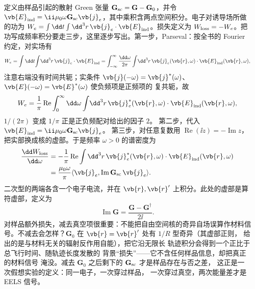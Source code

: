 定义由样品引起的散射 Green 张量 \(\mathbf G_{\rm sc}=\mathbf G-\mathbf G_0\)，并令 \(\vb{E}_{\rm ind}=\ii\mu_0\omega\mathbf G_{\rm sc}\vb{j}_e\)，其中乘积含两点空间积分。电子对诱导场所做的功为 \(W_e=\int\dd t\int\dd^3r\,\vb{j}_e\cdot\vb{E}_{\rm ind}\)。损失定义为 \(W_{\rm loss}=-W_e\)。把功写成频率积分要走三步，这里逐步写出。第一步，Parseval：按全书的 Fourier 约定，对实场有
\[
W_e=\int\dd t\!\int\!\dd^3r\,\vb{j}_e\cdot\vb{E}_{\rm ind}
=\int_{-\infty}^{\infty}\frac{\dd\omega}{2\pi}
\int\!\dd^3r\,\vb{j}_e(\vb{r},\omega)\cdot
\vb{E}_{\rm ind}(\vb{r},\omega),
\]
注意右端没有时间共轭；实条件
\(\vb{j}(-\omega)=\vb{j}^*(\omega)\)、
\(\vb{E}(-\omega)=\vb{E}^*(\omega)\) 使负频项是正频项的
复共轭，故
\[
W_e=\frac1\pi\operatorname{Re}\int_0^\infty\dd\omega
\int\!\dd^3r\,\vb{j}_e^*(\vb{r},\omega)\cdot
\vb{E}_{\rm ind}(\vb{r},\omega),
\]
\(1/(2\pi)\) 变成 \(1/\pi\) 正是正负频配对给出的因子 \(2\)。
第二步，代入 \(\vb{E}_{\rm ind}=\ii\mu_0\omega\mathbf G_{\rm sc}\vb{j}_e\)。
第三步，对任意复数用
\(\operatorname{Re}(\ii z)=-\operatorname{Im}z\)，
把实部换成核的虚部。于是频率 \(\omega>0\) 的谱密度为
\begin{equation}
\begin{aligned}
\frac{\dd W_{\rm loss}}{\dd\omega}
&=-\frac1\pi\operatorname{Re}\int\dd^3r\,
\vb{j}_e^*(\vb{r},\omega)\cdot\vb{E}_{\rm ind}(\vb{r},\omega)\\
&=\frac{\mu_0\omega}{\pi}
\langle\vb{j}_e,\operatorname{Im}\mathbf G_{\rm sc}\,\vb{j}_e\rangle .
\end{aligned}
\label{eq:feqo-eels-work}
\end{equation}
二次型的两端各含一个电子电流，并在 \(\vb{r},\vb{r}'\) 上积分。此处的虚部是算符虚部，定义为
\[
\operatorname{Im}\mathbf G
=\frac{\mathbf G-\mathbf G^\dagger}{2\ii}.
\]
对样品额外损失，减去真空项很重要：不能把自由空间核的奇异自场误算作材料信号。不减去会怎样？\(\mathbf G_0\)
在 \(\vb{r}=\vb{r}'\) 处有 \(1/R\) 型奇异（其虚部正则，
给出的是与材料无关的辐射反作用自能），把它沿无限长
轨迹积分会得到一个正比于总飞行时间、随轨迹长度发散的
背景“损失”——它不含任何样品信息，却把真正的材料信号
淹没。减去 \(\mathbf G_0\) 之后剩下的
\(\mathbf G_{\rm sc}\) 才是样品存在与否之差，
这正是一次假想实验的定义：同一电子，一次穿过样品，
一次穿过真空，两次能量差才是 EELS 信号。

